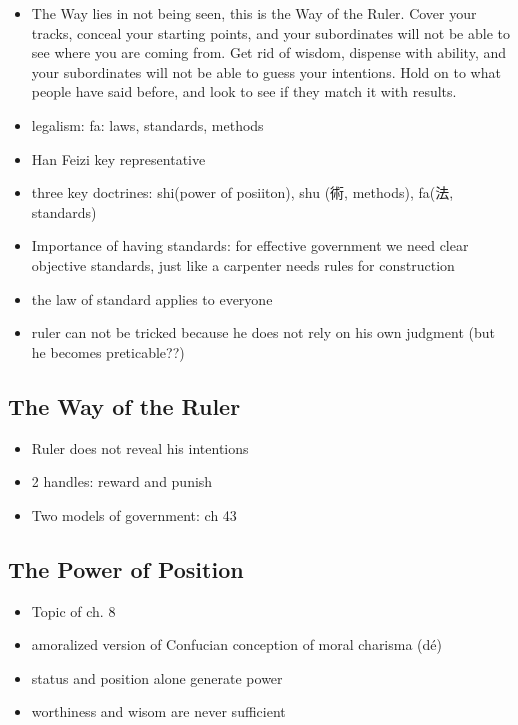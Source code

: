 \documentclass[emulatestandardclasses]{scrartcl}
\begin{document}
\begin{itemize}
  \item The Way lies in not being seen, this is the Way of the Ruler. Cover your tracks, conceal your starting points, and your subordinates will not be able to see where you are coming from. Get rid of wisdom, dispense with ability, and your subordinates will not be able to guess your intentions. Hold on to what people have said before, and look to see if they match it with results.
  \item legalism: fa: laws, standards, methods
  \item Han Feizi key representative
  \item three key doctrines: shi(power of posiiton), shu (術, methods), fa(法, standards)
  \item Importance of having standards: for effective government we need clear objective standards, just like a carpenter needs rules for construction
  \item the law of standard applies to everyone
  \item ruler can not be tricked because he does not rely on his own judgment (but he becomes preticable??)
\end{itemize}

\subsection{The Way of the Ruler}

\begin{itemize}
  \item Ruler does not reveal his intentions
  \item 2 handles: reward and punish
  \item Two models of government: ch 43
\end{itemize}

\subsection{The Power of Position}

\begin{itemize}
  \item Topic of ch. 8
  \item amoralized version of Confucian conception of moral charisma (dé)
  \item status and position alone generate power
  \item worthiness and wisom are never sufficient
\end{itemize}
\end{document}
